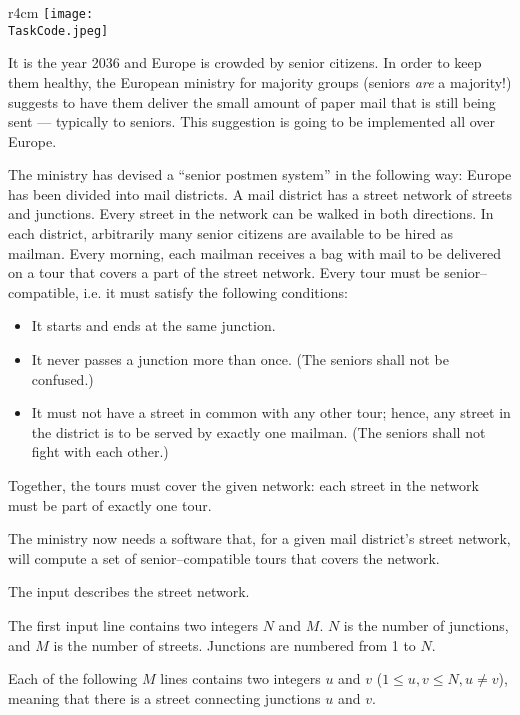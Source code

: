 \documentclass{boi2014}
\renewcommand{\TaskCode}{postmen}
\begin{document}
    \begin{wrapfigure}[8]{r}{4cm}
        \vspace{-18pt}
		\texttt{[image: \\TaskCode.jpeg]}
	\end{wrapfigure}
    It is the year 2036 and Europe is crowded by senior citizens. In order to
    keep them healthy, the European ministry for majority groups (seniors
    \emph{are} a majority!) suggests to have them deliver the small amount of
    paper mail that is still being sent --- typically to seniors. This
    suggestion is going to be implemented all over Europe.

    The ministry has devised a ``senior postmen system'' in the following way:
    Europe has been divided into mail districts. A mail district has a street
    network of streets and junctions. Every street in the network can be walked
    in both directions. In each district, arbitrarily many senior citizens are
    available to be hired as mailman. Every morning, each mailman receives a bag
    with mail to be delivered on a tour that covers a part of the street
    network. Every tour must be senior--compatible, i.e. it must satisfy the
    following conditions:

    \begin{itemize}
        \item It starts and ends at the same junction.
        \item It never passes a junction more than once. (The seniors shall not
        be confused.)
        \item It must not have a street in common with any other tour; hence,
        any street in the district is to be served by exactly one mailman. (The
        seniors shall not fight with each other.)
    \end{itemize}

    Together, the tours must cover the given network: each street in the network
    must be part of exactly one tour.

    \Task
    The ministry now needs a software that, for a given mail district’s street
    network, will compute a set of senior--compatible tours that covers the
    network.

    \Input
    The input describes the street network.

    The first input line contains two integers $N$ and $M$. $N$ is the number of
    junctions, and $M$ is the number of streets. Junctions are numbered from 1
    to $N$.

    Each of the following $M$ lines contains two integers $u$ and $v$
    ($1 \le u, v \le N, u \neq v$), meaning that
    there is a street connecting junctions $u$ and $v$.
\end{document}
